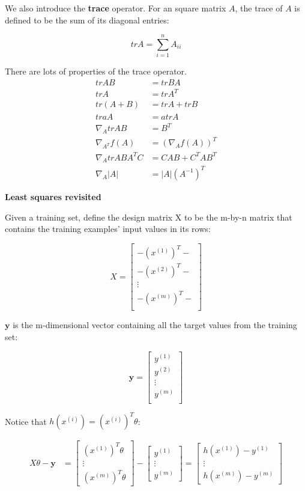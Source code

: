 \documentclass[fontset=windows,pass]{article}
\numberwithin{equation}{subsection} %
\begin{document}
We also introduce the \textbf{trace} operator. For an square matrix $A$, the trace of $A$ is defined
to be the sum of its diagonal entries:

\[
	tr A = \sum_{i=1}^{n}A_{ii}
\]

There are lots of properties of the trace operator.
\begin{align*}
	tr AB & = tr BA\\
	tr A & = tr A^T\\
	tr (A+B) & = tr A + tr B\\
	tr aA & = atr A\\
	\nabla_A tr AB & = B^T\\
	\nabla_{A^T} f(A) & = \left(\nabla_A f(A)\right)^T\\
	\nabla_A tr AB{A^T}C & = CAB + C^TA{B^T}\\
	\nabla_A \left|A\right| & = \left|A\right| \left(A^{-1}\right)^T
\end{align*}

\begin{flushleft}
	{\Large \textbf{Least squares revisited}}
\end{flushleft}

Given a training set, define the design matrix X to be the m-by-n matrix that contains the training examples'
input values in its rows:

\[
	X = \begin{bmatrix}
		-\left(x^{(1)}\right)^T-\\
		-\left(x^{(2)}\right)^T-\\
		\vdots\\
		-\left(x^{(m)}\right)^T-\\
	\end{bmatrix}
\]

$\boldsymbol{y}$ is the m-dimensional vector containing all the target values from the training set:

\[
	\boldsymbol{y} = \begin{bmatrix}
		y^{(1)}\\
		y^{(2)}\\
		\vdots\\
		y^{(m)}\\
	\end{bmatrix}
\]

Notice that $h(x^{(i)}) = \left(x^{(i)}\right)^T \theta$:

\begin{align*}
	X \theta - \boldsymbol{y} & = \begin{bmatrix}
		\left(x^{(1)}\right)^T \theta\\
		\vdots\\
		\left(x^{(m)}\right)^T \theta
	\end{bmatrix} 
	- \begin{bmatrix}
		y^{(1)}\\
		\vdots\\
		y^{(m)}
	\end{bmatrix} = \begin{bmatrix}
		h(x^{(1)}) - y^{(1)}\\
		\vdots\\
		h(x^{(m)}) - y^{(m)}
	\end{bmatrix}
\end{align*}
\end{document}
